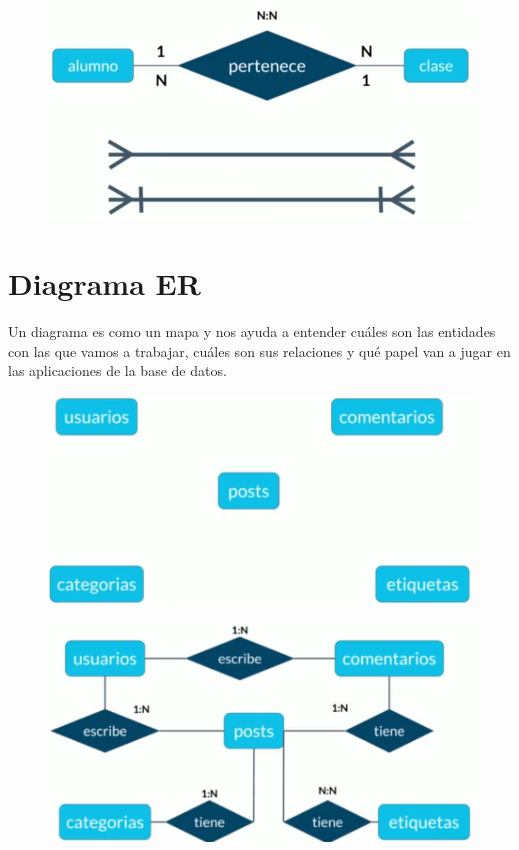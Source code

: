 \documentclass{article}
\begin{document}
\newpage

\begin{figure}[h!]
    \centering
      \includegraphics[scale=0.5]{./Pictures/018_card_N_N.png}
\end{figure}


\section{Diagrama ER}%
Un diagrama es como un mapa y nos ayuda a entender cuáles son las entidades con
las que vamos a trabajar, cuáles son sus relaciones y qué papel van a jugar en
las aplicaciones de la base de datos.

\begin{figure}[h!]
    \centering
      \includegraphics[scale=0.5]{./Pictures/018_DiagramaER.png}
\end{figure}

\begin{figure}[h!]
    \centering
      \includegraphics[scale=0.5]{./Pictures/019_diagrama_ER.png}
\end{figure}
\end{document}
